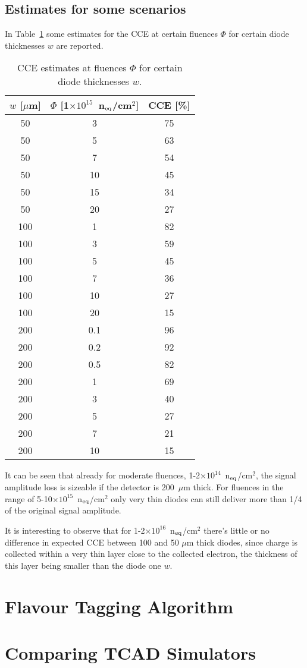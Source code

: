 \subsection{Estimates for some scenarios}

In Table~\ref{tab:cce_scenarios} some estimates for the CCE at certain fluences $\Phi$ for 
certain diode thicknesses $w$ are reported.

\begin{table}[h]
\centering
\begin{tabular}{ccc}
\hline
$w$ [$\mu$m] & $\Phi$ [1$\times10^{15}$~n$_{\rm eq}$/cm$^2$] & CCE [\%] \\
\hline
\hline
50 & 3 & 75 \\
50 & 5 & 	63 \\
50 & 7 & 54 \\
50 & 	10 & 	45 \\
50 & 15 & 34 \\
50 & 20 & 27\\
\hline
100 & 1 & 82 \\
100 & 3 & 59 \\
100 & 5 & 	45 \\
100 & 7 & 36 \\
100 & 10 & 27 \\
100 & 20 & 15 \\
\hline
200 & 0.1 & 96\\
200 & 0.2 & 92\\
200 & 0.5 & 82\\
200 & 1 & 69 \\
200 & 3 & 40 \\
200 & 5 & 	27 \\
200 & 7 & 21 \\
200 & 10 & 15 \\
\hline
\end{tabular}
\caption{\label{tab:cce_scenarios}CCE estimates at fluences $\Phi$ for 
certain diode thicknesses $w$.}
\end{table}

It can be seen that already for moderate fluences, 1-2$\times10^{14}$~n$_{\rm eq}$/cm$^2$, 
the signal amplitude loss is sizeable if the detector is 200~$\mu$m thick. 
For fluences in the range of 5-10$\times10^{15}$~n$_{\rm eq}$/cm$^2$ only very thin diodes 
can still deliver more than 1/4 of the original signal amplitude. 

It is interesting to observe that for 1-2$\times10^{16}$~n$_{\rm eq}$/cm$^2$ there's little or no 
difference in expected CCE between 100 and 50 $\mu$m thick diodes, since charge is collected 
within a very thin layer close to the collected electron, the thickness of this layer being smaller 
than the diode one $w$.




\section{Flavour Tagging Algorithm}

\section{Comparing TCAD Simulators}
